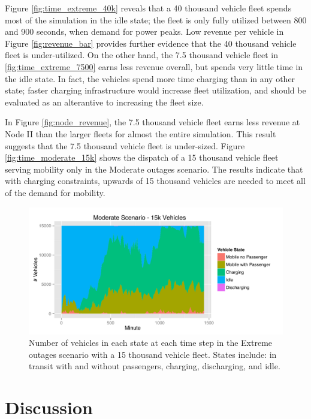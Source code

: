 \documentclass[journal]{IEEEtran}
\begin{document}
Figure \ref{fig:time_extreme_40k} reveals that a 40 thousand vehicle fleet spends most of the simulation in the idle state; the fleet is only fully utilized between 800 and 900 seconds, when demand for power peaks. Low revenue per vehicle in Figure \ref{fig:revenue_bar} provides further evidence that the 40 thousand vehicle fleet is under-utilized. On the other hand, the 7.5 thousand vehicle fleet in \ref{fig:time_extreme_7500} earns less revenue overall, but spends very little time in the idle state. In fact, the vehicles spend more time charging than in any other state; faster charging infrastructure would increase fleet utilization, and should be evaluated as an alterantive to increasing the fleet size.

In Figure \ref{fig:node_revenue}, the 7.5 thousand vehicle fleet earns less revenue at Node II than the larger fleets for almost the entire simulation. This result suggests that the 7.5 thousand vehicle fleet is under-sized. Figure \ref{fig:time_moderate_15k} shows the dispatch of a 15 thousand vehicle fleet serving mobility only in the Moderate outages scenario. The results indicate that with charging constraints, upwards of 15 thousand vehicles are needed to meet all of the demand for mobility.

\begin{figure}[!htbp]
  \includegraphics[width=\linewidth]{plots/states-area-moderate-15k.pdf}
  \caption{Number of vehicles in each state at each time step in the Extreme outages scenario with a 15 thousand vehicle fleet. States include: in transit with and without passengers, charging, discharging, and idle.}
  \label{fig:time_extreme_15k}
\end{figure}

\section{Discussion}
\end{document}
